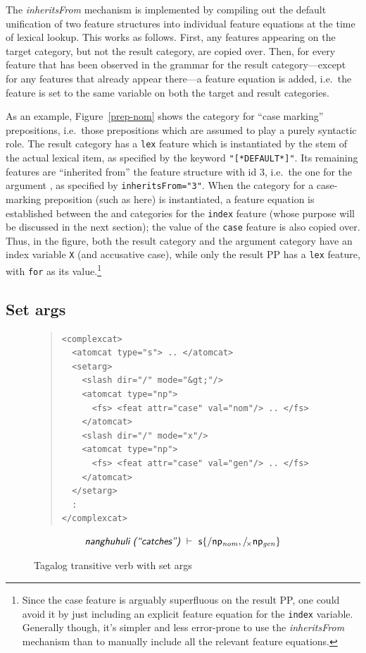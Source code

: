 \documentclass[11pt]{article}
\begin{document}
The \textsl{inheritsFrom} mechanism is implemented by compiling out the
default unification of two feature structures into individual feature
equations at the time of lexical lookup. This works as follows. First,
any features appearing on the target category, but not the result
category, are copied over. Then, for every feature that has been
observed in the grammar for the result category---except for any
features that already appear there---a feature equation is added, i.e.\
the feature is set to the same variable on both the target and result
categories.

As an example, Figure~\ref{prep-nom} shows the category for ``case
marking'' prepositions, i.e.\ those prepositions which are assumed to
play a purely syntactic role. The \cf{pp} result category has a
\texttt{lex} feature which is instantiated by the stem of the actual
lexical item, as specified by the keyword \texttt{"[*DEFAULT*]"}. Its
remaining features are ``inherited from'' the feature structure with id
3, i.e.\ the one for the argument \cf{np}, as specified by
\texttt{inheritsFrom="3"}. When the category for a case-marking
preposition (such as  here) is instantiated, a feature equation
is established between the \cf{pp} and \cf{np} categories for the
\texttt{index} feature (whose purpose will be discussed in the next
section); the value of the \texttt{case} feature is also copied over.
Thus, in the figure, both the \cf{pp} result category and the \cf{np}
argument category have an index variable \texttt{X} (and accusative
case), while only the result PP has a \texttt{lex} feature, with
\texttt{for} as its value.\footnote{Since the case feature is arguably
superfluous on the result PP, one could avoid it by just including an
explicit feature equation for the \texttt{index} variable. Generally
though, it's simpler and less error-prone to use the
\textsl{inheritsFrom} mechanism than to manually include all the
relevant feature equations.}

\subsection{Set args}

\begin{figure}
\begin{quote}
\begin{verbatim}
<complexcat>
  <atomcat type="s"> .. </atomcat>
  <setarg>
    <slash dir="/" mode="&gt;"/>
    <atomcat type="np">
      <fs> <feat attr="case" val="nom"/> .. </fs>
    </atomcat>
    <slash dir="/" mode="x"/>
    <atomcat type="np">
      <fs> <feat attr="case" val="gen"/> .. </fs>
    </atomcat>
  </setarg>
  :
</complexcat>
\end{verbatim}
\end{quote}
\[
\textsf{\textsl{nanghuhuli (``catches'')}} ~ \vdash ~ 
\mathsf{s} \{ / \mathsf{np_{\mathit{nom}}}, /\!_{\times} \mathsf{np_{\mathit{gen}}} \} 
\]
\caption{Tagalog transitive verb with set args}
\label{tagalog-set-args}
\end{figure}
\end{document}
